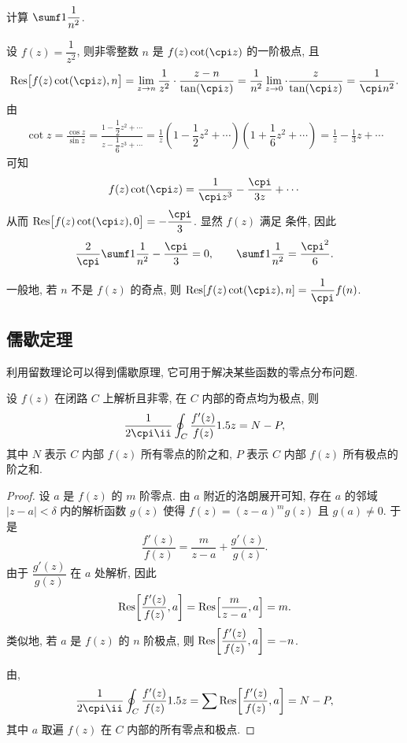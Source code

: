 \begin{example}\label{exam:bessel-question}
  计算 $\sumf1 \dfrac1{n^2}$.
\end{example}

\begin{solution}
  设 $f(z)=\dfrac1{z^2}$, 则非零整数 $n$ 是 $f(z)\cot(\cpi z)$ 的一阶极点, 且
  \[
     \Res\bigl[f(z)\cot(\cpi z),n\bigr]
    =\lim_{z\ra n}\frac1{z^2}\cdot\frac{z-n}{\tan(\cpi z)}
    =\frac1{n^2}\lim_{z\ra 0}\cdot\frac{z}{\tan(\cpi z)}
    =\frac1{\cpi n^2}.
  \]
  由
  \begin{align*}
     \cot z
    =\frac{\cos z}{\sin z}
    =\frac{1-\dfrac12z^2+\cdots}{z-\dfrac16z^3+\cdots}
    =\frac1z(1-\dfrac12z^2+\cdots)(1+\dfrac16z^2+\cdots)
    =\frac1z-\frac13z+\cdots
  \end{align*}
  可知
  \[
     f(z)\cot(\cpi z)
    =\frac1{\cpi z^3}-\frac{\cpi}{3z}+\cdots
  \]
  从而 $\Res\bigl[f(z)\cot(\cpi z),0\bigr]=-\dfrac\cpi3$.
  显然 $f(z)$ 满足 条件, 因此
  \[
    \frac2\cpi\sumf1 \frac1{n^2}-\frac\cpi3=0,\qquad
    \sumf1 \frac1{n^2}=\frac{\cpi^2}6.
  \]
\end{solution}

一般地, 若 $n$ 不是 $f(z)$ 的奇点, 则 $\Res[f(z)\cot(\cpi z),n]=\dfrac1\cpi f(n)$.


\subsection{儒歇定理}

利用留数理论可以得到儒歇原理, 它可用于解决某些函数的零点分布问题.

\begin{theorem}
  \label{thm:log-f-derivative-sum-order}
  设 $f(z)$ 在闭路 $C$ 上解析且非零, 在 $C$ 内部的奇点均为极点, 则
  \[
    \frac1{2\cpi\ii}\oint_C\frac{f'(z)}{f(z)}\d z
    =N-P,
  \]
  其中 $N$ 表示 $C$ 内部 $f(z)$ 所有零点的阶之和, $P$ 表示 $C$ 内部 $f(z)$ 所有极点的阶之和.
\end{theorem}

\begin{proof}
  设 $a$ 是 $f(z)$ 的 $m$ 阶零点.
  由 $a$ 附近的洛朗展开可知, 存在 $a$ 的邻域 $|z-a|<\delta$ 内的解析函数 $g(z)$ 使得 $f(z)=(z-a)^mg(z)$ 且 $g(a)\neq 0$.
  于是
  \[
    \frac{f'(z)}{f(z)}=\frac m{z-a}+\frac{g'(z)}{g(z)}.
  \]
  由于 $\dfrac{g'(z)}{g(z)}$ 在 $a$ 处解析, 因此
  \[
     {\mathrm{Res}}\biggl[\frac{f'(z)}{f(z)},a\biggr]
    ={\mathrm{Res}}\Bigl[\frac m{z-a},a\Bigr]
    =m.
  \]
  类似地, 若 $a$ 是 $f(z)$ 的 $n$ 阶极点, 则 ${\mathrm{Res}}\biggl[\dfrac{f'(z)}{f(z)},a\biggr]=-n$.

  由\thmRes,
  \[
     \frac1{2\cpi\ii}\oint_C\frac{f'(z)}{f(z)}\d z
    =\sum\Res\biggl[\frac{f'(z)}{f(z)},a\biggr]=N-P,
  \]
  其中 $a$ 取遍 $f(z)$ 在 $C$ 内部的所有零点和极点.
\end{proof}

